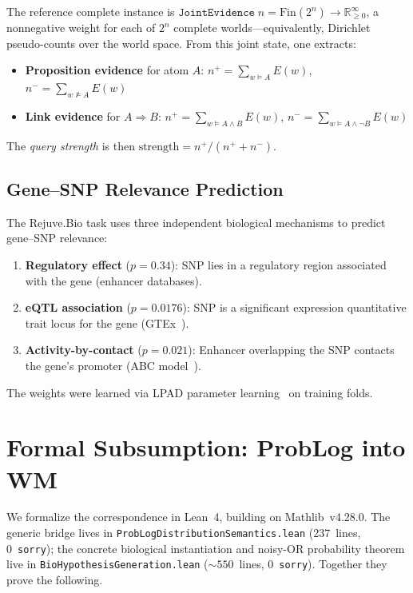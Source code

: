 \documentclass[]{article}
\newcommand{\code}[1]{\texttt{#1}}
\newcommand{\ty}[1]{\ensuremath{\mathtt{#1}}}
\newcommand{\JointEvidence}{\ty{JointEvidence}}
\newcommand{\nplus}{\ensuremath{n^{+}}}
\newcommand{\nminus}{\ensuremath{n^{-}}}
\begin{document}
The reference complete instance is $\JointEvidence\;n = \mathrm{Fin}(2^n) \to \mathbb{R}_{\geq 0}^{\infty}$,
a nonneg\-ative weight for each of $2^n$ complete worlds---equivalently, Dirichlet
pseudo-counts over the world space.  From this joint state, one extracts:
\begin{itemize}
\item \textbf{Proposition evidence} for atom $A$: $\nplus = \sum_{w \models A} E(w)$,\;
  $\nminus = \sum_{w \not\models A} E(w)$
\item \textbf{Link evidence} for $A \Rightarrow B$: $\nplus = \sum_{w \models A \wedge B} E(w)$,\;
  $\nminus = \sum_{w \models A \wedge \neg B} E(w)$
\end{itemize}
The \emph{query strength} is then $\text{strength} = \nplus / (\nplus + \nminus)$.

\subsection{Gene--SNP Relevance Prediction}

The Rejuve.Bio task uses three independent biological mechanisms to predict
gene--SNP relevance:
\begin{enumerate}
\item \textbf{Regulatory effect} ($p = 0.34$): SNP lies in a regulatory region
  associated with the gene (enhancer databases).
\item \textbf{eQTL association} ($p = 0.0176$): SNP is a significant expression
  quantitative trait locus for the gene (GTEx~\cite{GTEx2020}).
\item \textbf{Activity-by-contact} ($p = 0.021$): Enhancer overlapping the SNP
  contacts the gene's promoter (ABC model~\cite{Nasser2021ABC}).
\end{enumerate}
The weights were learned via LPAD parameter learning~\cite{Riguzzi2018} on training
folds.

\section{Formal Subsumption: ProbLog into WM}
\label{sec:formal}

We formalize the correspondence in Lean~4, building on Mathlib~v4.28.0.
The generic bridge lives in \code{ProbLogDistributionSemantics.lean} (237~lines,
0~\code{sorry}); the concrete biological instantiation and noisy-OR probability
theorem live in \code{BioHypothesisGeneration.lean} (${\sim}550$~lines,
0~\code{sorry}).  Together they prove the following.
\end{document}
